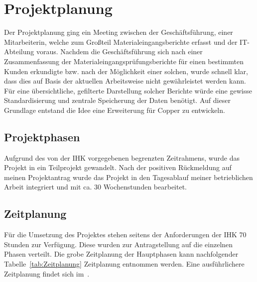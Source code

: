 \section{Projektplanung} 
\label{sec:Projektplanung}
Der Projektplanung ging ein Meeting zwischen der Geschäftsführung, einer Mitarbeiterin, welche zum Großteil Materialeingangsberichte erfasst und der IT-Abteilung voraus. Nachdem die Geschäftsführung sich nach einer Zusammenfassung der Materialeingangsprüfungsberichte für einen bestimmten Kunden erkundigte bzw. nach der Möglichkeit einer solchen, wurde schnell klar, dass dies auf Basis der aktuellen Arbeitsweise nicht gewährleistet werden kann. Für eine übersichtliche, gefilterte Darstellung solcher Berichte würde eine gewisse Standardisierung und zentrale Speicherung der Daten benötigt. Auf dieser Grundlage entstand die Idee eine Erweiterung für Copper zu entwickeln.

\subsection{Projektphasen}
\label{sec:Projektphasen}
Aufgrund des von der \ac{IHK} vorgegebenen begrenzten Zeitrahmens, wurde das Projekt in ein Teilprojekt gewandelt. Nach der positiven Rückmeldung auf meinen Projektantrag wurde das Projekt in den Tagesablauf meiner betrieblichen Arbeit integriert und mit ca. 30 Wochenstunden bearbeitet.

\subsection{Zeitplanung}
\label{sec:Zeitplanung}
Für die Umsetzung des Projektes stehen seitens der Anforderungen der \ac{IHK} 70 Stunden zur Verfügung. Diese wurden zur Antragstellung auf die einzelnen Phasen verteilt. Die grobe Zeitplanung der Hauptphasen kann nachfolgender Tabelle~\ref{tab:Zeitplanung} Zeitplanung entnommen werden. Eine ausführlichere Zeitplanung findet sich im~.


